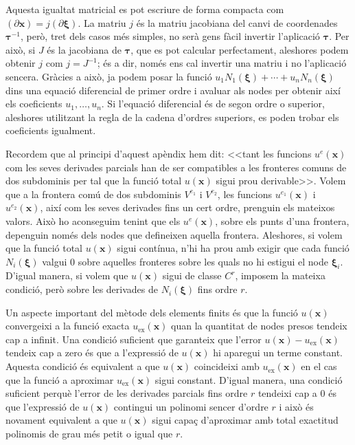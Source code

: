 \documentclass{article}
\begin{document}
Aquesta igualtat matricial es pot escriure de forma compacta com $(\partial\boldsymbol{x})=j(\partial\boldsymbol{\xi})$. La matriu $j$ \'{e}s la matriu jacobiana del canvi de coordenades $\boldsymbol{\tau}^{-1}$, per\`{o}, tret dels casos m\'{e}s simples, no ser\`{a} gens f\`{a}cil invertir l'aplicaci\'{o} $\boldsymbol{\tau}$. Per aix\`{o}, si $J$ \'{e}s la jacobiana de $\boldsymbol{\tau}$, que es pot calcular perfectament, aleshores podem obtenir $j$ com $j=J^{-1}$; \'{e}s a dir, nom\'{e}s ens cal invertir una matriu i no l'aplicaci\'{o} sencera. Gr\`{a}cies a aix\`{o}, ja podem posar la funci\'{o} $u_1N_1(\boldsymbol{\xi})+\cdots+u_nN_n(\boldsymbol{\xi})$ dins una equaci\'{o} diferencial de primer ordre i avaluar als nodes per obtenir aix\'{i} els coeficients $u_1,\ldots,u_n$. Si l'equaci\'{o} diferencial \'{e}s de segon ordre o superior, aleshores utilitzant la regla de la cadena d'ordres superiors, es poden trobar els coeficients igualment.

Recordem que al principi d'aquest ap\`{e}ndix hem dit: <<tant les funcions $u^e(\boldsymbol{x})$ com les seves derivades parcials han de ser compatibles a les fronteres comuns de dos subdominis per tal que la funci\'{o} total $u(\boldsymbol{x})$ sigui prou derivable>>. Volem que a la frontera com\'{u} de dos subdominis $V^{e_1}$ i $V^{e_2}$, les funcions $u^{e_1}(\boldsymbol{x})$ i $u^{e_2}(\boldsymbol{x})$, aix\'{i} com les seves derivades fins un cert ordre, prenguin els mateixos valors. Aix\`{o} ho aconseguim tenint que els $u^e(\boldsymbol{x})$, sobre els punts d'una frontera, depenguin nom\'{e}s dels nodes que defineixen aquella frontera. Aleshores, si volem que la funci\'{o} total $u(\boldsymbol{x})$ sigui cont\'{i}nua, n'hi ha prou amb exigir que cada funci\'{o} $N_i(\boldsymbol{\xi})$ valgui 0 sobre aquelles fronteres sobre les quals no hi estigui el node $\boldsymbol{\xi}_i$. D'igual manera, si volem que $u(\boldsymbol{x})$ sigui de classe $C^r$, imposem la mateixa condici\'{o}, per\`{o} sobre les derivades de $N_i(\boldsymbol{\xi})$ fins ordre $r$.

Un aspecte important del m\`{e}tode dels elements finits \'{e}s que la funci\'{o} $u(\boldsymbol{x})$ convergeixi a la funci\'{o} exacta $u_{\text{ex}}(\boldsymbol{x})$ quan la quantitat de nodes presos tendeix cap a infinit. Una condici\'{o} suficient que garanteix que l'error $u(\boldsymbol{x})-u_{\text{ex}}(\boldsymbol{x})$ tendeix cap a zero \'{e}s que a l'expressi\'{o} de $u(\boldsymbol{x})$ hi aparegui un terme constant. Aquesta condici\'{o} \'{e}s equivalent a que $u(\boldsymbol{x})$ coincideixi amb $u_{\text{ex}}(\boldsymbol{x})$ en el cas que la funci\'{o} a aproximar $u_{\text{ex}}(\boldsymbol{x})$ sigui constant. D'igual manera, una condici\'{o} suficient perqu\`{e} l'error de les derivades parcials fins ordre $r$ tendeixi cap a 0 \'{e}s que l'expressi\'{o} de $u(\boldsymbol{x})$ contingui un polinomi sencer d'ordre $r$ i aix\`{o} \'{e}s novament equivalent a que $u(\boldsymbol{x})$ sigui capa\c{c} d'aproximar amb total exactitud polinomis de grau m\'{e}s petit o igual que $r$.
\end{document}
